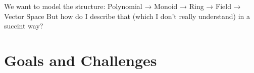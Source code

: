 \documentclass{scrartcl}
\begin{document}

We want to model the structure:
Polynomial → Monoid → Ring → Field → Vector Space
But how do I describe that (which I don't really understand) in a succint way?












\section{Goals and Challenges}



\end{document}
